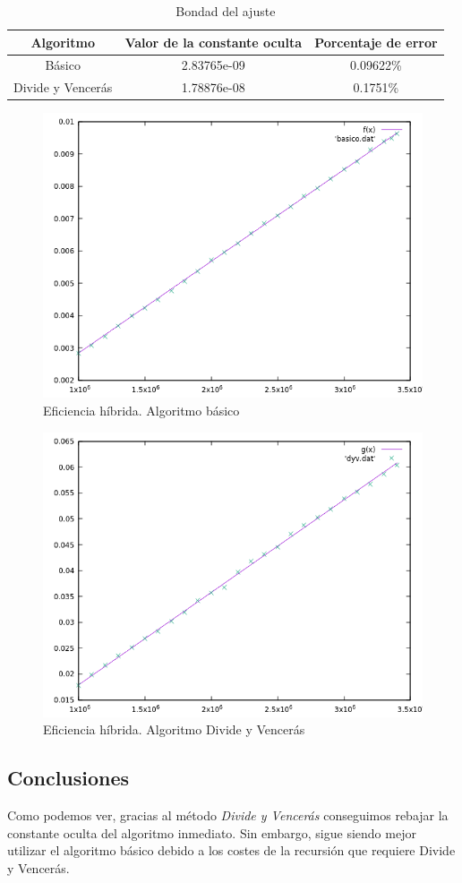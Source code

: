 \documentclass[12pt,spanish]{article}
\begin{document}
\begin{table}[H]
\centering
\begin{tabular}{|c|c|c|}
\hline
\textbf{Algoritmo} & \textbf{Valor de la constante oculta} & \textbf{Porcentaje de error} \\
\hline
Básico & 2.83765e-09 & 0.09622\% \\
\hline
Divide y Vencerás & 1.78876e-08 & 0.1751\%\\
\hline
\end{tabular}
\caption{Bondad del ajuste}
\end{table}

\begin{figure}[H]
\centering
\includegraphics[scale=0.85]{hibrida_basico.png}
\caption{Eficiencia híbrida. Algoritmo básico}
\end{figure}

\begin{figure}[H]
\centering
\includegraphics[scale=0.85]{hibrida_dyv.png}
\caption{Eficiencia híbrida. Algoritmo Divide y Vencerás}
\end{figure}

\subsection{Conclusiones}
Como podemos ver, gracias al método \emph{Divide y Vencerás} conseguimos rebajar la constante oculta del algoritmo inmediato. Sin embargo, sigue siendo mejor utilizar el algoritmo básico debido a los costes de la recursión que requiere Divide y Vencerás.
\end{document}
